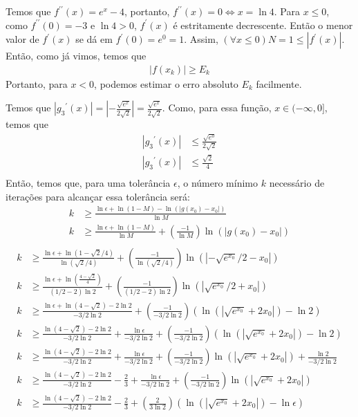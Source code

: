 \documentclass{article}
\begin{document}
    Temos que $f^{\prime \prime}(x) = e^x - 4$, portanto, $f^{\prime \prime}(x) = 0 \iff x = \ln 4$.
    Para $x \leq 0$, como $f^{\prime \prime}(0) = -3$ e $\ln 4 > 0$, $f^\prime(x)$ é estritamente decrescente. Então o menor valor de $f^\prime(x)$ se dá em $f^\prime(0) = e^0 = 1$. Assim, $(\forall x \leq 0) N = 1 \leq |f^\prime(x)|$.\\
    Então, como já vimos, temos que
    \begin{align*}
        |f(x_k)| \geq E_k
    \end{align*}
    Portanto, para $x < 0$, podemos estimar o erro absoluto $E_k$ facilmente.
    
    Temos que $|{g_3}^\prime(x)| = |-\frac{\sqrt{e^x}}{2 \sqrt{2}}| = \frac{\sqrt{e^x}}{2 \sqrt{2}}$. Como, para essa função, $x \in (-\infty, 0]$, temos que
    \begin{align*}
        |{g_3}^\prime(x)| &\leq \frac{\sqrt{e^0}}{2 \sqrt{2}}\\
        |{g_3}^\prime(x)| &\leq \frac{\sqrt{2}}{4}\\
    \end{align*}
    Então, temos que, para uma tolerância $\epsilon$, o número mínimo $k$ necessário de iterações para alcançar essa tolerância será:
    \begin{align*}
        k &\geq \frac{\ln \epsilon + \ln(1 - M) - \ln(|g(x_0) - x_0|)}{\ln M}\\
        k &\geq \frac{\ln \epsilon + \ln(1 - M)}{\ln M} +
        \left(\frac{-1}{\ln M}\right){\ln(|g(x_0) - x_0|)}\\
    \end{align*}
    \begin{align*}
        k &\geq \frac{\ln \epsilon + \ln(1 - \sqrt{2}/4)}{\ln (\sqrt{2}/4)} +
        \left(\frac{-1}{\ln (\sqrt{2}/4)}\right){\ln(|- \sqrt{e^{x_0}}/2 - x_0|)}\\
        k &\geq \frac{\ln \epsilon + \ln(\frac{4 - \sqrt{2}}{4})}{(1/2 - 2)\ln 2} +
        \left(\frac{-1}{(1/2 - 2)\ln 2}\right){\ln(|\sqrt{e^{x_0}}/2 + x_0|)}\\
        k &\geq \frac{\ln \epsilon + \ln(4 - \sqrt{2}) - 2\ln 2}{-3/2 \ln 2} +
        \left(\frac{-1}{-3/2\ln 2}\right)(\ln(|\sqrt{e^{x_0}} + 2x_0|) - \ln 2)\\
        k &\geq \frac{\ln(4 - \sqrt{2}) - 2\ln 2}{-3/2 \ln 2} +
        \frac{\ln \epsilon}{-3/2 \ln 2} +
        \left(\frac{-1}{-3/2\ln 2}\right)(\ln(|\sqrt{e^{x_0}} + 2x_0|) - \ln 2)\\
        k &\geq \frac{\ln(4 - \sqrt{2}) - 2\ln 2}{-3/2 \ln 2} +
        \frac{\ln \epsilon}{-3/2 \ln 2} +
        \left(\frac{-1}{-3/2\ln 2}\right)\ln(|\sqrt{e^{x_0}} + 2x_0|) + \frac{\ln 2}{-3/2 \ln 2}\\
        k &\geq \frac{\ln(4 - \sqrt{2}) - 2\ln 2}{-3/2 \ln 2} - \frac{2}{3} +
        \frac{\ln \epsilon}{-3/2 \ln 2} +
        \left(\frac{-1}{-3/2\ln 2}\right)\ln(|\sqrt{e^{x_0}} + 2x_0|)\\
        k &\geq \frac{\ln(4 - \sqrt{2}) - 2\ln 2}{-3/2 \ln 2} - \frac{2}{3} +
        \left(\frac{2}{3\ln 2}\right)(\ln(|\sqrt{e^{x_0}} + 2x_0|) - \ln \epsilon)\\
    \end{align*}
\end{document}
